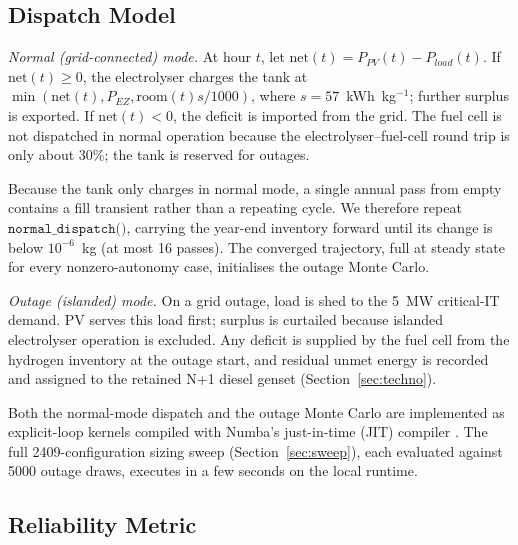 \documentclass[conference]{IEEEtran}
\begin{document}
\subsection{Dispatch Model}

\emph{Normal (grid-connected) mode.} At hour $t$, let $\mathrm{net}(t) = P_{PV}(t)-P_{load}(t)$. If $\mathrm{net}(t)\ge0$, the electrolyser charges the tank at $\min(\mathrm{net}(t),P_{EZ},\mathrm{room}(t)s/1000)$, where $s=57$~kWh~kg$^{-1}$; further surplus is exported. If $\mathrm{net}(t)<0$, the deficit is imported from the grid. The fuel cell is not dispatched in normal operation because the electrolyser--fuel-cell round trip is only about 30\%; the tank is reserved for outages.

Because the tank only charges in normal mode, a single annual pass from empty contains a fill transient rather than a repeating cycle. We therefore repeat $\texttt{normal\_dispatch()}$, carrying the year-end inventory forward until its change is below $10^{-6}$~kg (at most 16 passes). The converged trajectory, full at steady state for every nonzero-autonomy case, initialises the outage Monte Carlo.

\emph{Outage (islanded) mode.} On a grid outage, load is shed to the 5~MW critical-IT demand. PV serves this load first; surplus is curtailed because islanded electrolyser operation is excluded. Any deficit is supplied by the fuel cell from the hydrogen inventory at the outage start, and residual unmet energy is recorded and assigned to the retained N+1 diesel genset (Section~\ref{sec:techno}).

Both the normal-mode dispatch and the outage Monte Carlo are implemented as explicit-loop kernels compiled with Numba's just-in-time (JIT) compiler \cite{lam2015numba}. The full 2409-configuration sizing sweep (Section~\ref{sec:sweep}), each evaluated against 5000 outage draws, executes in a few seconds on the local runtime.

\subsection{Reliability Metric}
\end{document}
